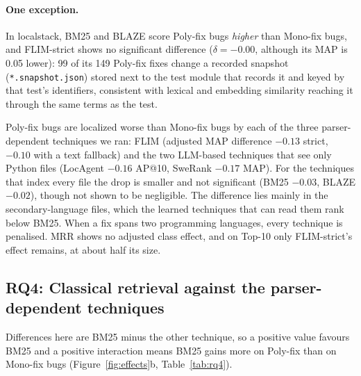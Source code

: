 \documentclass[a4paper,fleqn]{cas-dc}
\newcommand{\mono}{Mono-fix\xspace}
\newcommand{\poly}{Poly-fix\xspace}
\begin{document}
\paragraph{One exception.} In localstack, BM25 and BLAZE score Poly-fix bugs
\emph{higher} than Mono-fix bugs, and FLIM-strict shows no significant
difference ($\delta=-0.00$, although its MAP is 0.05 lower): 99 of
its 149 Poly-fix fixes change a recorded snapshot
(\texttt{*.snapshot.json}) stored next to the test module that records it and
keyed by that test's identifiers, consistent with lexical and embedding
similarity reaching it through the same terms as the test.

\begin{tcolorbox}[title=Answer to RQ3]
\poly bugs are localized worse than \mono bugs by each of the three
parser-dependent techniques we ran: FLIM (adjusted MAP difference $-0.13$ strict, $-0.10$ with a text
fallback) and the two LLM-based techniques that see only Python files
(LocAgent $-0.16$ AP@10, SweRank $-0.17$ MAP). For the techniques that index
every file the drop is smaller and not significant (BM25 $-0.03$, BLAZE
$-0.02$), though not shown to be negligible. The difference lies mainly in the
secondary-language files, which the learned techniques that can read them
rank below BM25. When a fix spans two programming languages, every technique is
penalised. MRR shows no adjusted class effect, and on Top-10 only FLIM-strict's
effect remains, at about half its size.
\end{tcolorbox}

\subsection{RQ4: Classical retrieval against the parser-dependent techniques}\label{sec:rq4}

Differences here are BM25 minus the other technique, so a positive value
favours BM25 and a positive interaction means BM25 gains more on Poly-fix than
on Mono-fix bugs (Figure~\ref{fig:effects}b, Table~\ref{tab:rq4}).


\end{document}
